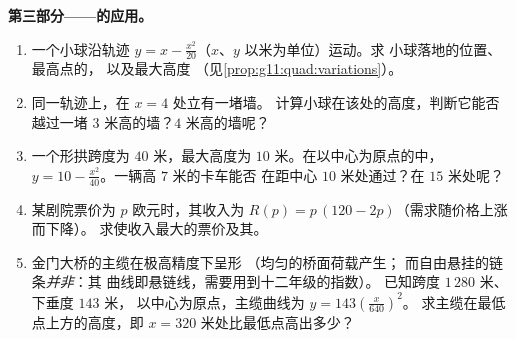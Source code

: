 \begin{problem}
\medskip
\noindent\textbf{第三部分——的应用。}
\begin{enumerate}[resume]
  \item 一个小球沿轨迹
        $y = x - \frac{x^2}{20}$（$x$、$y$ 以米为单位）运动。求
        小球落地的位置、最高点的，
        以及最大高度
        （见\cref{prop:g11:quad:variations}）。
  \item 同一轨迹上，在 $x = 4$ 处立有一堵墙。
        计算小球在该处的高度，判断它能否越过一堵
        $3$ 米高的墙？$4$ 米高的墙呢？
  \item 一个形拱跨度为 $40$ 米，最大高度为
        $10$ 米。在以中心为原点的中，
        $y = 10 - \frac{x^2}{40}$。一辆高 $7$ 米的卡车能否
        在距中心 $10$ 米处通过？在 $15$ 米处呢？
  \item 某剧院票价为 $p$ 欧元时，其收入为
        $R(p) = p\,(120 - 2p)$（需求随价格上涨而下降）。
        求使收入最大的票价及其。
  \item 金门大桥的主缆在极高精度下呈形
        （均匀的桥面荷载产生；
        而自由悬挂的链条\emph{并非}：其
        曲线即悬链线，需要用到十二年级的指数）。
        已知跨度 $1\,280$ 米、下垂度 $143$ 米，
        以中心为原点，主缆曲线为 $y = 143\left(\frac{x}{640}\right)^2$。
        求主缆在最低点上方的高度，即
        $x = 320$ 米处比最低点高出多少？
\end{enumerate}


\end{problem}
